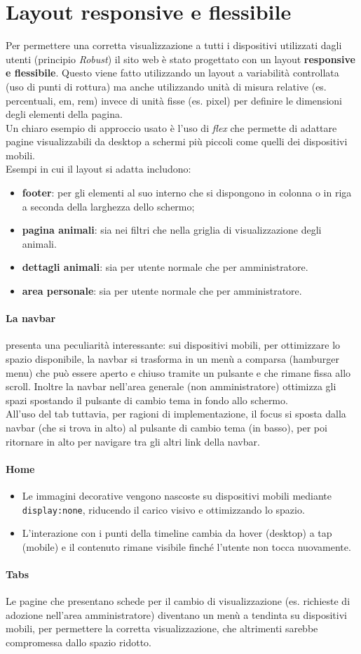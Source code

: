 \section{Layout responsive e flessibile}
\label{sec:layout_responsive}
Per permettere una corretta visualizzazione a tutti i dispositivi utilizzati dagli utenti (principio \textit{Robust}) il sito web è stato progettato con un layout \textbf{responsive e flessibile}.
Questo viene fatto utilizzando un layout a variabilità controllata (uso di punti di rottura) ma anche utilizzando unità di misura relative (es. percentuali, em, rem) invece di unità fisse (es. pixel) per definire le dimensioni degli elementi della pagina.\\
Un chiaro esempio di approccio usato è l'uso di \textit{flex} che permette di adattare pagine visualizzabili da desktop a schermi più piccoli come quelli dei dispositivi mobili.\\
Esempi in cui il layout si adatta includono:
\begin{itemize}
    \item \textbf{footer}: per gli elementi al suo interno che si dispongono in colonna o in riga a seconda della larghezza dello schermo;
    \item \textbf{pagina animali}: sia nei filtri che nella griglia di visualizzazione degli animali.
    \item \textbf{dettagli animali}: sia per utente normale che per amministratore.
    \item \textbf{area personale}: sia per utente normale che per amministratore.
\end{itemize}
\paragraph{La navbar} presenta una peculiarità interessante: sui dispositivi mobili, per ottimizzare lo spazio disponibile, la navbar si trasforma in un menù a comparsa (hamburger menu) che può essere aperto e chiuso tramite un pulsante e che rimane fissa allo scroll. 
Inoltre la navbar nell'area generale (non amministratore) ottimizza gli spazi spostando il pulsante di cambio tema in fondo allo schermo.\\ All'uso del tab tuttavia, per ragioni di implementazione, il focus si sposta dalla navbar (che si trova in alto) al pulsante di cambio tema (in basso), per poi ritornare in alto per navigare tra gli altri link della navbar.
\paragraph{Home}
\begin{itemize}
    \item Le immagini decorative vengono nascoste su dispositivi mobili mediante \texttt{display:none}, riducendo il carico visivo e ottimizzando lo spazio.
    \item L'interazione con i punti della timeline cambia da hover (desktop) a tap (mobile) e il contenuto rimane visibile finché l'utente non tocca nuovamente.
\end{itemize}
\paragraph{Tabs}
Le pagine che presentano schede per il cambio di visualizzazione (es. richieste di adozione nell'area amministratore) diventano un menù a tendinta su dispositivi mobili, per permettere la corretta visualizzazione, che altrimenti sarebbe compromessa dallo spazio ridotto.